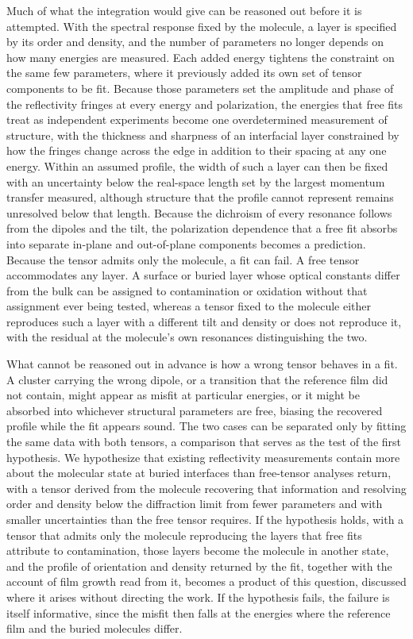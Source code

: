 Much of what the integration would give can be reasoned out before it is attempted. With the spectral response fixed by the molecule, a layer is specified by its order and density, and the number of parameters no longer depends on how many energies are measured. Each added energy tightens the constraint on the same few parameters, where it previously added its own set of tensor components to be fit. Because those parameters set the amplitude and phase of the reflectivity fringes at every energy and polarization, the energies that free fits treat as independent experiments become one overdetermined measurement of structure, with the thickness and sharpness of an interfacial layer constrained by how the fringes change across the edge in addition to their spacing at any one energy. Within an assumed profile, the width of such a layer can then be fixed with an uncertainty below the real-space length set by the largest momentum transfer measured, although structure that the profile cannot represent remains unresolved below that length. Because the dichroism of every resonance follows from the dipoles and the tilt, the polarization dependence that a free fit absorbs into separate in-plane and out-of-plane components becomes a prediction. Because the tensor admits only the molecule, a fit can fail. A free tensor accommodates any layer. A surface or buried layer whose optical constants differ from the bulk can be assigned to contamination or oxidation without that assignment ever being tested, whereas a tensor fixed to the molecule either reproduces such a layer with a different tilt and density or does not reproduce it, with the residual at the molecule's own resonances distinguishing the two.

What cannot be reasoned out in advance is how a wrong tensor behaves in a fit. A cluster carrying the wrong dipole, or a transition that the reference film did not contain, might appear as misfit at particular energies, or it might be absorbed into whichever structural parameters are free, biasing the recovered profile while the fit appears sound. The two cases can be separated only by fitting the same data with both tensors, a comparison that serves as the test of the first hypothesis. We hypothesize that existing reflectivity measurements contain more about the molecular state at buried interfaces than free-tensor analyses return, with a tensor derived from the molecule recovering that information and resolving order and density below the diffraction limit from fewer parameters and with smaller uncertainties than the free tensor requires. If the hypothesis holds, with a tensor that admits only the molecule reproducing the layers that free fits attribute to contamination, those layers become the molecule in another state, and the profile of orientation and density returned by the fit, together with the account of film growth read from it, becomes a product of this question, discussed where it arises without directing the work. If the hypothesis fails, the failure is itself informative, since the misfit then falls at the energies where the reference film and the buried molecules differ.


